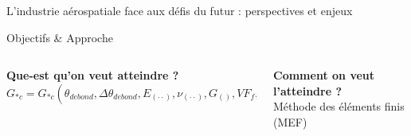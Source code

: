 \documentclass[final]{beamer}
\begin{document}
\begin{frame}
\begin{center}
\begin{minipage}{\textwidth}
\begin{block}{\rule[-0.6ex]{0pt}{50pt}\centering\LARGE L'industrie a\'erospatiale face aux d\'efis du futur : perspectives et enjeux}
\end{block}
\end{minipage}
\end{center}

\begin{center}
	\begin{minipage}{\textwidth}
		\begin{alertblock}{\rule[-0.6ex]{0pt}{50pt}\centering\LARGE Objectifs \& Approche}
			\begin{columns}
				\begin{column}{0.6\textwidth}
   					 \begin{center}
						\textbf{\LARGE Que-est qu'on veut atteindre ?}\\[5pt]
						 \LARGE $G_{*c}=G_{*c}\left(\theta_{debond},\Delta\theta_{debond}, E_{\left(\cdot\cdot\right)}, \nu_{\left(\cdot\cdot\right)}, G_{\left(\right)},VF_{f}, t_{ply}, \frac{t_{ply}}{t_{bounding\ plies}}\right)$
   					\end{center}
				\end{column}
				\begin{column}{0.4\textwidth}  %
   					\begin{center}
						\textbf{\LARGE Comment on veut l'atteindre ?}\\[5pt]
						 \LARGE M\'ethode des \'el\'ements finis (MEF)
   					\end{center}
				\end{column}
			\end{columns}
		\end{alertblock}
	\end{minipage}
\end{center}




\end{frame}
\end{document}
